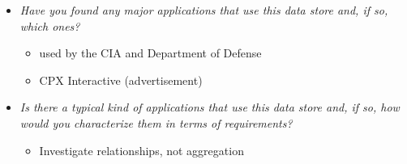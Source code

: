 
\begin{itemize}
\item \emph{Have you found any major applications that use this data store and, if so, which ones?}
	\begin{itemize}
		\item used by the CIA and Department of Defense
		\item CPX Interactive (advertisement)
	\end{itemize}
\item \emph{Is there a typical kind of applications that use this data store and, if so, how would you characterize them in terms of requirements?}
	\begin{itemize}
		\item Investigate relationships, not aggregation
	\end{itemize}
\end{itemize}
